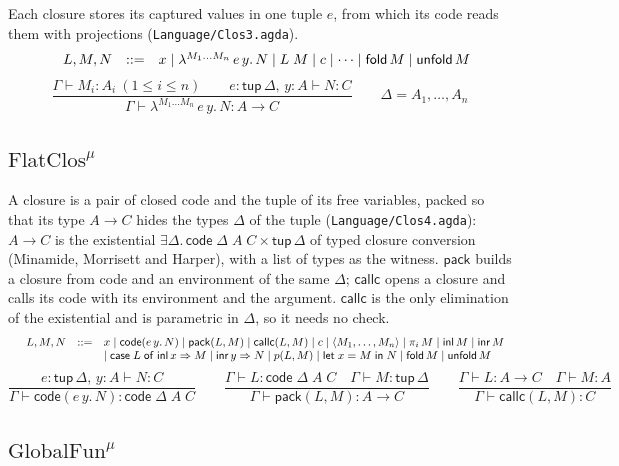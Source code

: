 \documentclass[10pt]{article}
\makeatletter
\theoremstyle{acmplain}
\newcommand{\key}[1]{\mathsf{#1}}
\newcommand{\clos}[2]{\lambda^{#1}\, #2.\,}
\newcommand{\Let}{\key{let}\;}
\newcommand{\In}{\;\key{in}\;}
\newcommand{\inl}{\key{inl}\,}
\newcommand{\inr}{\key{inr}\,}
\newcommand{\Case}[5]{\key{case}\;#1\;\key{of}\;\key{inl}\,#2 \Rightarrow #3 \mid \key{inr}\,#4 \Rightarrow #5}
\newcommand{\tuple}[1]{\langle #1 \rangle}
\newcommand{\prj}[1]{\pi_{#1}\,}
\newcommand{\prim}[3]{#1(#2, #3)}
\newcommand{\Tcodetm}[3]{\key{code}(#1\,#2.\,#3)}  %
\newcommand{\Tpack}[2]{\key{pack}(#1, #2)}     %
\newcommand{\Tcallc}[2]{\key{callc}(#1, #2)}   %
\newcommand{\Ml}[1]{\textrm{#1}^{\mu}}                  %
\newcommand{\Mtup}[1]{\key{tup}\,#1}                      %
\newcommand{\Mcodety}[3]{\key{code}\;#1\;#2\;#3}          %
\newcommand{\Mfold}{\key{fold}\,}
\newcommand{\Munfold}{\key{unfold}\,}
\newenvironment{syntax}{\[\begin{array}{l@{\quad}rcl}}{\end{array}\]}
\makeatother
\begin{document}
Each closure stores its captured values in one tuple $e$, from which its
code reads them with projections (\texttt{Language/Clos3.agda}).
\begin{syntax}
  & L, M, N &::=& x \mid \clos{M_1\ldots M_n}{e\, y} N
    \mid L\;M \mid c \mid \cdots \mid \Mfold M \mid \Munfold M
\end{syntax}
\[
  \frac{\Gamma \vdash M_i : A_i \ (1 \leq i \leq n) \qquad
        e{:}\Mtup{\Delta},\, y{:}A \vdash N : C}
       {\Gamma \vdash \clos{M_1\ldots M_n}{e\, y} N : A \rightarrow C}
  \qquad \Delta = A_1, \ldots, A_n
\]

\subsection{\texorpdfstring{$\Ml{FlatClos}$}{FlatClos-mu}}

A closure is a pair of closed code and the tuple of its free variables,
packed so that its type $A \rightarrow C$ hides the types $\Delta$ of the
tuple (\texttt{Language/Clos4.agda}): $A \rightarrow C$ is the existential
$\exists \Delta.\, \Mcodety{\Delta}{A}{C} \times \Mtup{\Delta}$ of typed
closure conversion (Minamide, Morrisett and Harper), with a list of types
as the witness. $\key{pack}$ builds a closure from code and an environment
of the same $\Delta$; $\key{callc}$ opens a closure and calls its code with
its environment and the argument. $\key{callc}$ is the only elimination of
the existential and is parametric in $\Delta$, so it needs no check.
\begin{syntax}
  & L, M, N &::=& x \mid \Tcodetm{e}{y}{N} \mid \Tpack{L}{M} \mid \Tcallc{L}{M}
    \mid c \mid \tuple{M_1,\ldots,M_n} \mid \prj{i} M \mid \inl M \mid \inr M \\
  &&& \mid \Case{L}{x}{M}{y}{N} \mid \prim{p}{L}{M}
    \mid \Let x = M \In N \mid \Mfold M \mid \Munfold M
\end{syntax}
\[
  \frac{e{:}\Mtup{\Delta},\, y{:}A \vdash N : C}
       {\Gamma \vdash \Tcodetm{e}{y}{N} : \Mcodety{\Delta}{A}{C}}
  \qquad
  \frac{\Gamma \vdash L : \Mcodety{\Delta}{A}{C} \quad \Gamma \vdash M : \Mtup{\Delta}}
       {\Gamma \vdash \Tpack{L}{M} : A \rightarrow C}
  \qquad
  \frac{\Gamma \vdash L : A \rightarrow C \quad \Gamma \vdash M : A}
       {\Gamma \vdash \Tcallc{L}{M} : C}
\]

\subsection{\texorpdfstring{$\Ml{GlobalFun}$}{GlobalFun-mu}}
\end{document}
